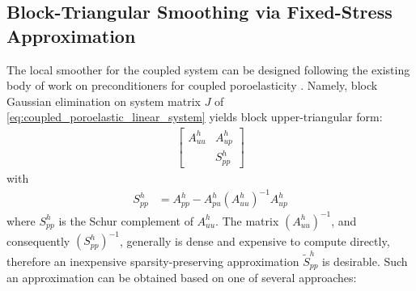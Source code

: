 \subsection{Block-Triangular Smoothing via Fixed-Stress Approximation}
\label{subsec:coupled_smoothing}

The local smoother for the coupled system can be designed following the existing body of work on preconditioners for coupled poroelasticity \cite{White2011,White2015,Castelletto2015,Castelletto2019}.   Namely, block Gaussian elimination on system matrix $J$ of \cref{eq:coupled_poroelastic_linear_system} yields block upper-triangular form:
\begin{align}
    \begin{bmatrix}
        A_{uu}^h & A_{up}^h \\
                 & S_{pp}^h
    \end{bmatrix}
    \label{eq:coupled_poroelastic_schur_system}
\end{align}
with
\begin{align}
    S_{pp}^h &= A_{pp}^h - A_{pu}^h (A_{uu}^h)^{-1} A_{up}^h \label{eq:coupled_poroelastic_schur_complement}
\end{align}
where $S_{pp}^h$ is the Schur complement of $A_{uu}^h$.   The matrix $(A_{uu}^h)^{-1}$, and consequently $(S_{pp}^h)^{-1}$, generally is dense and expensive to compute directly, therefore an inexpensive sparsity-preserving approximation $\tilde{S}_{pp}^h$ is desirable.   Such an approximation can be obtained based on one of several approaches:
